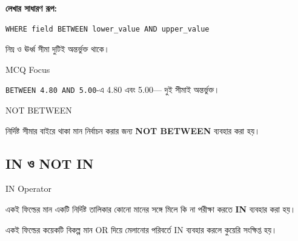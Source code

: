 \textbf{লেখার সাধারণ রূপ:}

\par\noindent\begin{minipage}{\linewidth}
\begin{verbatim}
WHERE field BETWEEN lower_value AND upper_value
\end{verbatim}
\end{minipage}\par

নিম্ন ও ঊর্ধ্ব সীমা দুটিই অন্তর্ভুক্ত থাকে।

\noindent\par\smallskip

\begin{boardbox}{MCQ Focus}

\texttt{BETWEEN 4.80 AND 5.00}-এ 4.80 এবং 5.00—
দুই সীমাই অন্তর্ভুক্ত।

\end{boardbox}

\begin{definitionbox}{NOT BETWEEN}

নির্দিষ্ট সীমার বাইরে থাকা মান নির্বাচন করার জন্য
\textbf{NOT BETWEEN} ব্যবহার করা হয়।

\end{definitionbox}

\noindent\par\smallskip



\subsection{IN ও NOT IN}

\begin{definitionbox}{IN Operator}

একই ফিল্ডের মান একটি নির্দিষ্ট তালিকার কোনো মানের সঙ্গে
মিলে কি না পরীক্ষা করতে \textbf{IN} ব্যবহার করা হয়।

\end{definitionbox}

একই ফিল্ডের কয়েকটি বিকল্প মান OR দিয়ে মেলানোর পরিবর্তে IN ব্যবহার করলে কুয়েরি সংক্ষিপ্ত হয়।

